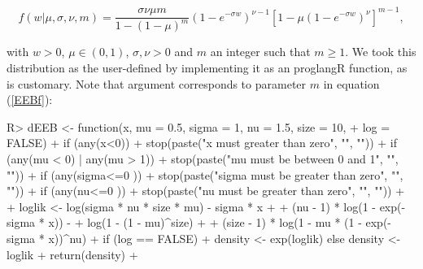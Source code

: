 \documentclass[nojss]{jss}
\begin{document}
\begin{equation} \label{EEBf}
  f(w|\mu, \sigma, \nu, m) = \frac{\sigma\nu\mu m}{1-(1-\mu)^m} \left(1 - e^{-\sigma w} \right)^{\nu-1} \left[ 1 - \mu\left(1 - e^{-\sigma w} \right)^\nu \right]^{m-1},
\end{equation}

with $w>0$, $\mu \in (0,1)$, $\sigma, \nu>0$ and $m$ an integer such that $m \geq 1$. We took this distribution as the user-defined by implementing it as an proglang{R} function, as is customary. Note that argument  corresponds to parameter $m$ in equation (\ref{EEBf}):

\begin{Schunk}
\begin{Sinput}
R> dEEB <- function(x, mu = 0.5, sigma = 1, nu = 1.5, size = 10,
+                   log = FALSE){
+    if (any(x<0))
+      stop(paste("x must greater than zero", "\n", ""))
+    if (any(mu < 0) | any(mu > 1))
+      stop(paste("mu must be between 0 and 1", "\n", ""))
+    if (any(sigma<=0 ))
+      stop(paste("sigma must be greater than zero", "\n", ""))
+    if (any(nu<=0 ))
+      stop(paste("nu must be greater than zero", "\n", ""))
+  
+    loglik <- log(sigma * nu * size *  mu) - sigma * x +
+              (nu - 1) * log(1 - exp(-sigma * x)) -
+              log(1 - (1 - mu)^size) +
+              (size - 1) * log(1 - mu * (1 - exp(-sigma * x))^nu)
+    if (log == FALSE)
+      density <- exp(loglik) else density <- loglik
+    return(density)
+  }
\end{Sinput}
\end{Schunk}
\end{document}
